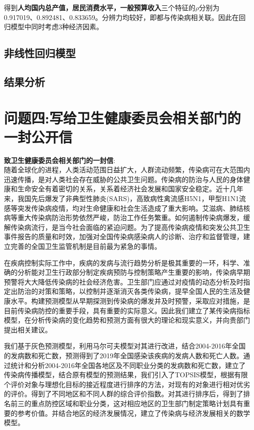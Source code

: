 \documentclass{whutmod}
\begin{document}
     	得到\textbf{人均国内总产值，居民消费水平，一般预算收入}三个特征的$\rho $分别为0.917019、0.892481、0.833659。分辨力均较好，即都与传染病相关联。因此在回归模型中同时考虑3种经济因素。

     
     
     \subsection{非线性回归模型}   
     
     
     \subsection{结果分析}
     
     
    \section{问题四:写给卫生健康委员会相关部门的一封公开信}
    \textbf{致卫生健康委员会相关部门的一封信}:
    ~\\
    
    随着全球化的进程，人类活动范围日益扩大，人群流动频繁，传染病可在大范围内迅速传播，是对人类社会存在威胁的公共卫生问题。传染病的防治与人民的身体健康和生命安全有着密切的关系，关系着经济社会发展和国家安全稳定。近十几年来，我国先后爆发了非典型性肺炎(SARS)，高致病性禽流感H5N1，甲型H1N1流感等突发传染病疫情，均对生命健康和社会生活造成了重大影响。艾滋病、肺结核病等重大传染病防治形势依然严峻，防治工作任务繁重。如何遏制传染病爆发，缓解传染病流行，是当今社会面临的紧迫问题。为了提高传染病疫情和突发公共卫生事件报告的质量和时效，加强对全国传染病感染病人的诊断、治疗和监督管理，建立完善的全国卫生监管机制是目前最为紧急的事情。
    
    在疾病控制实际工作中，疾病的发病与流行趋势分析是极其重要的一环，科学、准确的分析能对卫生行政部分制定疾病预防与控制策略产生重要的影响，传染病早期预警将大大降低传染病的社会经济危害。卫生部门应通过对疫情的动态分析及时指定出防治的对策和策略，以控制并逐渐消灭各类传染病，提早全国人民的生活及健康水平。构建预测模型从早期探测到传染病的爆发并及时预警，采取应对措施，是目前传染病防控的重要手段，具有重要的实际意义。因此我们建立了某传染病指标模型，在分析传染病的变化趋势和预测方面有很大的理论和现实意义，并向贵部门提出相关建议。
    
    我们基于灰色预测模型，利用马尔可夫模型对其进行改进，结合2004-2016年全国的发病数和死亡数，预测得到了2019年全国感染该疾病的发病人数和死亡人数。通过统计和分析2004-2016年全国各地区及不同职业分类的发病数和死亡数，建立了传染病传播模型，结合原有模型的预测结果，我们引入了TOPSIS模型，根据有限个评价对象与理想化目标的接近程度进行排序的方法，对现有的对象进行相对优劣的评价。得到了不同地区和不同人群的综合评价指数。对其进行排序后，得到了排名前三的重点防控区域和职业分类，这对相应地区的卫生部门制定策略计划具有重要的参考价值。并结合地区的经济发展情况，建立了传染病与经济发展相关的数学模型。
    
\end{document}
